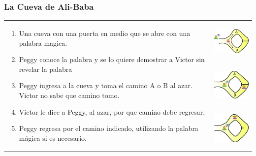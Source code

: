 \documentclass{beamer}
\begin{document}
\begin{frame}
    \frametitle{La Cueva de Ali-Baba}
    \begin{tabular}{p{7cm} p{3cm}}
        \multirow{3}{7cm}{
        \begin{enumerate}
            \item{Una cueva con una puerta en medio que se abre con una
            palabra magica.}
            \item{Peggy conoce la palabra y se lo quiere demostrar a Victor
            sin revelar la palabra}
            \item{Peggy ingresa a la cueva y toma el camino A o B al azar.
            Victor no sabe que camino tomo.}
            \item{Victor le dice a Peggy, al azar, por que camino debe regresar.}
            \item{Peggy regresa por el camino indicado, utilizando la palabra m\'agica
            si es necesario.}
        \end{enumerate}}
        & \vspace{0cm} \includegraphics[height=2cm]{alibaba1.png} \\
        & \vspace{0cm}\includegraphics[height=2cm]{alibaba2.png} \\
        & \vspace{0cm}\includegraphics[height=2cm]{alibaba3.png} \\
    \end{tabular}
    
\end{frame}
\end{document}
